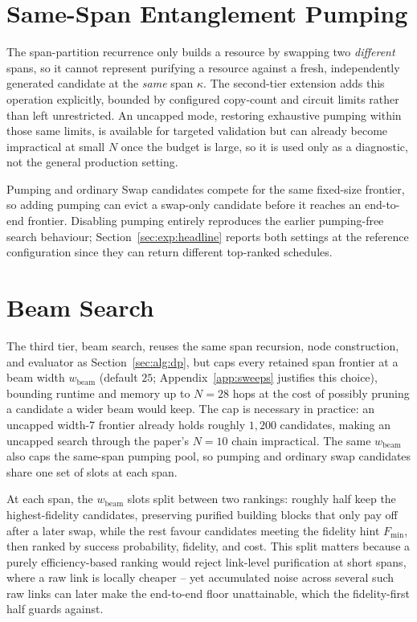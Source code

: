 \section{Same-Span Entanglement Pumping}
\label{sec:alg:pumping}

The span-partition recurrence only builds a resource by swapping two \emph{different} spans, so it cannot represent purifying a resource against a fresh, independently generated candidate at the \emph{same} span $\kappa$. The second-tier extension adds this operation explicitly, bounded by configured copy-count and circuit limits rather than left unrestricted. An uncapped mode, restoring exhaustive pumping within those same limits, is available for targeted validation but can already become impractical at small $N$ once the budget is large, so it is used only as a diagnostic, not the general production setting.

Pumping and ordinary Swap candidates compete for the same fixed-size frontier, so adding pumping can evict a swap-only candidate before it reaches an end-to-end frontier. Disabling pumping entirely reproduces the earlier pumping-free search behaviour; Section~\ref{sec:exp:headline} reports both settings at the reference configuration since they can return different top-ranked schedules.

\section{Beam Search}
\label{sec:alg:beam}

The third tier, beam search, reuses the same span recursion, node construction, and evaluator as Section~\ref{sec:alg:dp}, but caps every retained span frontier at a beam width $w_{\text{beam}}$ (default $25$; Appendix~\ref{app:sweeps} justifies this choice), bounding runtime and memory up to $N=28$ hops at the cost of possibly pruning a candidate a wider beam would keep. The cap is necessary in practice: an uncapped width-7 frontier already holds roughly $1{,}200$ candidates, making an uncapped search through the paper's $N=10$ chain impractical. The same $w_{\text{beam}}$ also caps the same-span pumping pool, so pumping and ordinary swap candidates share one set of slots at each span.

At each span, the $w_{\text{beam}}$ slots split between two rankings: roughly half keep the highest-fidelity candidates, preserving purified building blocks that only pay off after a later swap, while the rest favour candidates meeting the fidelity hint $F_{\min}$, then ranked by success probability, fidelity, and cost. This split matters because a purely efficiency-based ranking would reject link-level purification at short spans, where a raw link is locally cheaper -- yet accumulated noise across several such raw links can later make the end-to-end floor unattainable, which the fidelity-first half guards against.

